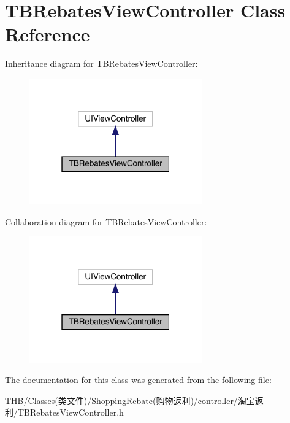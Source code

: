 \hypertarget{interface_t_b_rebates_view_controller}{}\section{T\+B\+Rebates\+View\+Controller Class Reference}
\label{interface_t_b_rebates_view_controller}


Inheritance diagram for T\+B\+Rebates\+View\+Controller\+:\nopagebreak
\begin{figure}[H]
\begin{center}
\leavevmode
\includegraphics[width=211pt]{interface_t_b_rebates_view_controller__inherit__graph}
\end{center}
\end{figure}


Collaboration diagram for T\+B\+Rebates\+View\+Controller\+:\nopagebreak
\begin{figure}[H]
\begin{center}
\leavevmode
\includegraphics[width=211pt]{interface_t_b_rebates_view_controller__coll__graph}
\end{center}
\end{figure}


The documentation for this class was generated from the following file\+:\begin{DoxyCompactItemize}
\item 
T\+H\+B/\+Classes(类文件)/\+Shopping\+Rebate(购物返利)/controller/淘宝返利/T\+B\+Rebates\+View\+Controller.\+h\end{DoxyCompactItemize}
